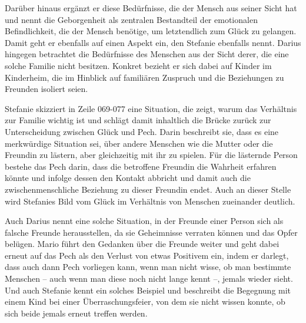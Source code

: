 Darüber hinaus ergänzt er diese Bedürfnisse, die der Mensch aus seiner Sicht hat und nennt die Geborgenheit als zentralen Bestandteil der emotionalen Befindlichkeit, die der Mensch benötige, um letztendlich zum Glück zu gelangen. 
Damit geht er ebenfalls auf einen Aspekt ein, den Stefanie ebenfalls nennt. 
Darius hingegen betrachtet die Bedürfnisse des Menschen aus der Sicht derer, die eine solche Familie nicht besitzen. 
Konkret bezieht er sich dabei auf Kinder im Kinderheim, die im Hinblick auf familiären Zuspruch und die Beziehungen zu Freunden isoliert seien.
 
Stefanie skizziert in Zeile 069-077 eine Situation, die zeigt, warum das Verhältnis zur Familie wichtig ist und schlägt damit inhaltlich die Brücke zurück zur Unterscheidung zwischen Glück und Pech. 
Darin beschreibt sie, dass es eine merkwürdige Situation sei, über andere Menschen wie die Mutter oder die Freundin zu lästern, aber gleichzeitig mit ihr zu spielen. 
Für die lästernde Person bestehe das Pech darin, dass die betroffene Freundin die Wahrheit erfahren könnte und infolge dessen den Kontakt abbricht und damit auch die zwischenmenschliche Beziehung zu dieser Freundin endet. 
Auch an dieser Stelle wird Stefanies Bild vom Glück im Verhältnis von Menschen zueinander deutlich. 

Auch Darius nennt eine solche Situation, in der Freunde einer Person sich als falsche Freunde herausstellen, da sie Geheimnisse verraten können und das Opfer belügen.
Mario führt den Gedanken über die Freunde weiter und geht dabei erneut auf das Pech als den Verlust von etwas Positivem ein, indem er darlegt, dass auch dann Pech vorliegen kann, wenn man nicht wisse, ob man bestimmte Menschen -- auch wenn man diese noch nicht lange kennt --, jemals wieder sieht. 
Und auch Stefanie kennt ein solches Beispiel und beschreibt die Begegnung mit einem Kind bei einer Überraschungsfeier, von dem sie nicht wissen konnte, ob sich beide jemals erneut treffen werden.

